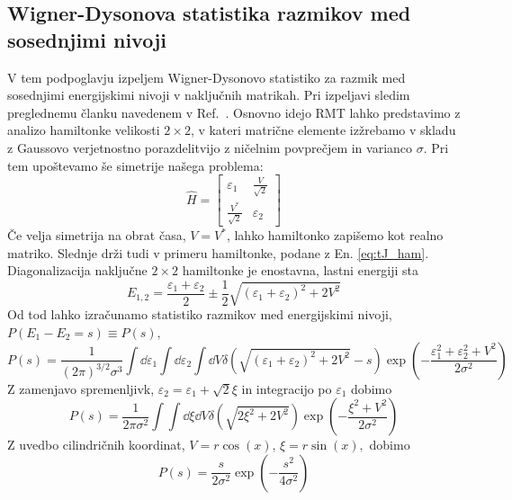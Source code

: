 \documentclass[10pt,a4paper]{article}
\begin{document}
 \subsection{Wigner-Dysonova statistika razmikov med sosednjimi nivoji} 
 V tem podpoglavju izpeljem Wigner-Dysonovo statistiko za razmik med sosednjimi energijskimi nivoji v naključnih matrikah. Pri izpeljavi sledim preglednemu članku navedenem v Ref.~\cite{abanin2018ergodicity}. Osnovno idejo RMT lahko predstavimo z analizo hamiltonke velikosti $2\times2$, v kateri matrične elemente izžrebamo v skladu z Gaussovo verjetnostno porazdelitvijo z ničelnim povprečjem in varianco $\sigma$.  Pri tem upoštevamo še simetrije našega problema:
 \begin{equation}\label{eq:rnd_ham}
 \hat{H}=
 \begin{bmatrix}
 \varepsilon_1 & \frac{V}{\sqrt{2}} \\
 \frac{V^*}{\sqrt{2}} & \varepsilon_2
 \end{bmatrix}
 \end{equation}
 Če velja simetrija na obrat časa, $V=V^*$, lahko hamiltonko zapišemo kot realno matriko. Slednje drži tudi v primeru hamiltonke, podane z En. \eqref{eq:tJ_ham}. Diagonalizacija naključne $2\times2$ hamiltonke je enostavna, lastni energiji sta
 \begin{equation}
 E_{1,2}=\frac{\varepsilon_1+\varepsilon_2}{2}\pm \frac{1}{2}\sqrt{\left(\varepsilon_1 +\varepsilon_2\right)^2 + 2V^2}
 \end{equation}
 Od tod lahko izračunamo statistiko razmikov med energijskimi nivoji, $P(E_1-E_2=s)\equiv P(s),$
\begin{equation}
 P(s)=\frac{1}{\left(2\pi\right)^{3/2}\sigma^3}\int \dd\varepsilon_1\int\dd\varepsilon_2\int \dd V \delta\left(\sqrt{\left(\varepsilon_1 +\varepsilon_2\right)^2 + 2V^2}-s\right)\exp\left( -\frac{\varepsilon_1^2+\varepsilon_2^2+V^2}{2\sigma^2}\right)
 \end{equation}
 Z zamenjavo spremenljivk, $\varepsilon_2=\varepsilon_1+\sqrt{2}\xi$ in integracijo po $\varepsilon_1$ dobimo 
 \begin{equation}
 P(s)=\frac{1}{2\pi\sigma^2}\int\int\dd\xi\dd V\delta\left(\sqrt{2\xi^2+2V^2}\right)\exp\left(-\frac{\xi^2+V^2}{2\sigma^2}\right)
 \end{equation}
 Z uvedbo cilindričnih koordinat, $V=r\cos(x)$, $\xi=r\sin(x),$ dobimo 
 \begin{equation}\label{eq:wigner_surmise}
 P(s)=\frac{s}{2\sigma^2}\exp\left(-\frac{s^2}{4\sigma^2} \right)
\end{equation}
\end{document}
